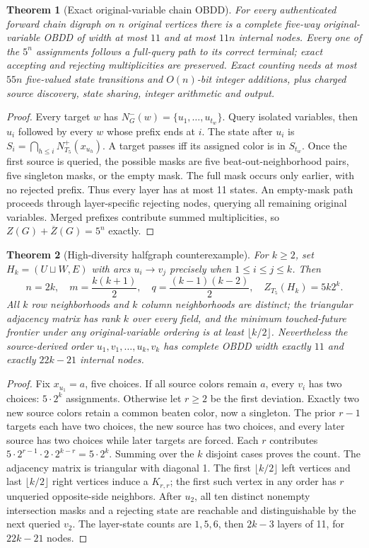 \documentclass[11pt]{article}
\newtheorem{theorem}{Theorem}
\begin{document}
\begin{theorem}[Exact original-variable chain OBDD]
For every authenticated forward chain digraph on $n$ original
vertices there is a complete five-way original-variable OBDD
of width at most $11$ and at most $11n$ internal nodes.
Every one of the $5^n$ assignments follows a full-query path
to its correct terminal; exact accepting and rejecting multiplicities
are preserved. Exact counting needs at most $55n$ five-valued
state transitions and $O(n)$-bit integer additions, plus charged
source discovery, state sharing, integer arithmetic and output.
\end{theorem}
\begin{proof}
Every target $w$ has $N_G^-(w)=\{u_1,\ldots,u_{t_w}\}$.
Query isolated variables, then $u_i$ followed by every $w$
whose prefix ends at $i$. The state after $u_i$ is
$S_i=\bigcap_{h\le i}N_{T_5}^+(x_{u_h})$.
A target passes iff its assigned color is in $S_{t_w}$.
Once the first source is queried, the possible masks are
five beat-out-neighborhood pairs, five singleton masks,
or the empty mask. The full mask occurs only earlier, with no
rejected prefix. Thus every layer has at most 11 states.
An empty-mask path proceeds through layer-specific rejecting
nodes, querying all remaining original variables. Merged
prefixes contribute summed multiplicities, so
$Z(G)+\overline{Z}(G)=5^n$ exactly.
\end{proof}

\begin{theorem}[High-diversity halfgraph counterexample]
For $k\ge2$, set $H_k=(U\sqcup W,E)$ with arcs
$u_i\to v_j$ precisely when $1\le i\le j\le k$.
Then
\[
n=2k,\quad m=\frac{k(k+1)}2,\quad
q=\frac{(k-1)(k-2)}2,\quad
\boxed{Z_{T_5}(H_k)=5k2^k}.
\]
All $k$ row neighborhoods and $k$ column neighborhoods
are distinct; the triangular adjacency matrix has rank $k$
over every field, and the minimum touched-future frontier
under any original-variable ordering is at least
$\lfloor k/2\rfloor$. Nevertheless the source-derived
order $u_1,v_1,\ldots,u_k,v_k$ has complete OBDD width
exactly $11$ and exactly $22k-21$ internal nodes.
\end{theorem}
\begin{proof}
Fix $x_{u_1}=a$, five choices. If all source colors remain
$a$, every $v_i$ has two choices: $5\cdot2^k$ assignments.
Otherwise let $r\ge2$ be the first deviation. Exactly two
new source colors retain a common beaten color, now a singleton.
The prior $r-1$ targets each have two choices, the new source
has two choices, and every later source has two choices while
later targets are forced. Each $r$ contributes
$5\cdot2^{r-1}\cdot2\cdot2^{k-r}=5\cdot2^k$.
Summing over the $k$ disjoint cases proves the count.
The adjacency matrix is triangular with diagonal 1.
The first $\lfloor k/2\rfloor$ left vertices and last
$\lfloor k/2\rfloor$ right vertices induce a $K_{r,r}$;
the first such vertex in any order has $r$ unqueried
opposite-side neighbors. After $u_2$, all ten distinct
nonempty intersection masks and a rejecting state are
reachable and distinguishable by the next queried $v_2$.
The layer-state counts are $1,5,6$, then $2k-3$ layers
of 11, for $22k-21$ nodes.
\end{proof}
\end{document}
